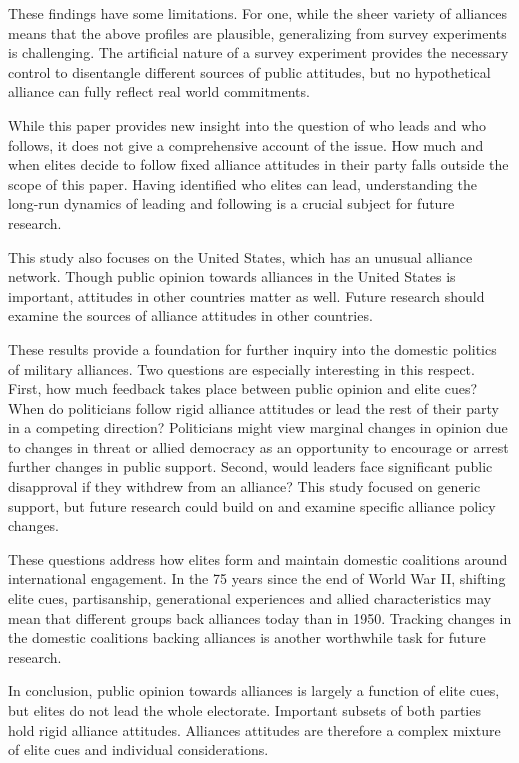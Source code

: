 \documentclass[12pt]{article}
\begin{document}
These findings have some limitations. 
For one, while the sheer variety of alliances means that the above profiles are plausible, generalizing from survey experiments is challenging. 
The artificial nature of a survey experiment provides the necessary control to disentangle different sources of public attitudes, but no hypothetical alliance can fully reflect real world commitments.


While this paper provides new insight into the question of who leads and who follows, it does not give a comprehensive account of the issue. 
How much and when elites decide to follow fixed alliance attitudes in their party falls outside the scope of this paper. 
Having identified who elites can lead, understanding the long-run dynamics of leading and following is a crucial subject for future research. 


This study also focuses on the United States, which has an unusual alliance network. 
Though public opinion towards alliances in the United States is important, attitudes in other countries matter as well. 
Future research should examine the sources of alliance attitudes in other countries. 


These results provide a foundation for further inquiry into the domestic politics of military alliances. 
Two questions are especially interesting in this respect.
First, how much feedback takes place between public opinion and elite cues? 
When do politicians follow rigid alliance attitudes or lead the rest of their party in a competing direction? 
Politicians might view marginal changes in opinion due to changes in threat or allied democracy as an opportunity to encourage or arrest further changes in public support.
Second, would leaders face significant public disapproval if they withdrew from an alliance? 
This study focused on generic support, but future research could build on \citet{TomzWeeks2021} and examine specific alliance policy changes. 


These questions address how elites form and maintain domestic coalitions around international engagement. 
In the 75 years since the end of World War II, shifting elite cues, partisanship, generational experiences and allied characteristics may mean that different groups back alliances today than in 1950. 
Tracking changes in the domestic coalitions backing alliances is another worthwhile task for future research.


In conclusion, public opinion towards alliances is largely a function of elite cues, but elites do not lead the whole electorate.  
Important subsets of both parties hold rigid alliance attitudes. 
Alliances attitudes are therefore a complex mixture of elite cues and individual considerations. 



\newpage

 
 
\end{document}
